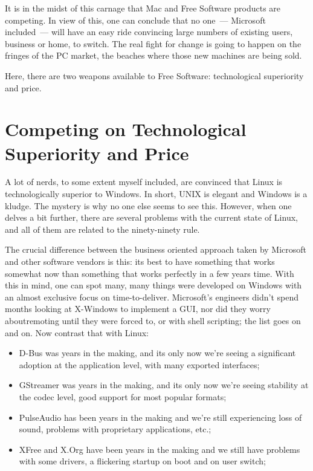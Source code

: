 \documentclass{memoir}
\begin{document}
It is in the midst of this carnage that Mac and Free Software products
are competing. In view of this, one can conclude that no one~---
Microsoft included~--- will have an easy ride convincing large numbers
of existing users, business or home, to switch. The real fight for
change is going to happen on the fringes of the PC market, the beaches
where those new machines are being sold.

Here, there are two weapons available to Free Software: technological
superiority and price.

\section{Competing on Technological Superiority and Price}

A lot of nerds, to some extent myself included, are convinced that
Linux is technologically superior to Windows. In short, UNIX is
elegant and Windows is a kludge. The mystery is why no one else seems
to see this. However, when one delves a bit further, there are several
problems with the current state of Linux, and all of them are related
to the ninety-ninety rule.

The crucial difference between the business oriented approach taken by
Microsoft and other software vendors is this: its best to have
something that works somewhat now than something that works perfectly
in a few years time. With this in mind, one can spot many, many things
were developed on Windows with an almost exclusive focus on
time-to-deliver. Microsoft's engineers didn't spend months looking at
X-Windows to implement a GUI, nor did they worry aboutremoting until
they were forced to, or with shell scripting; the list goes on and
on. Now contrast that with Linux:

\begin{itemize}
\item D-Bus was years in the making, and its only now we're seeing a
  significant adoption at the application level, with many exported
  interfaces;
\item GStreamer was years in the making, and its only now we're seeing
  stability at the codec level, good support for most popular formats;
\item PulseAudio has been years in the making and we're still
  experiencing loss of sound, problems with proprietary applications,
  etc.;
\item XFree and X.Org have been years in the making and we still have
  problems with some drivers, a flickering startup on boot and on user
  switch;
\end{itemize}
\end{document}
